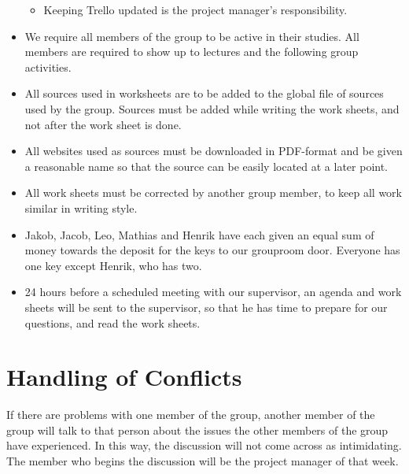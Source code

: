 \documentclass[a4paper,12pt,hidelinks]{article}
\begin{document}
\begin{itemize}
\begin{itemize}
		\item Keeping Trello updated is the project manager's responsibility.
		\end{itemize}
		\item We require all members of the group to be active in their studies. All members are required to show up to lectures and the following group activities.
		\item All sources used in worksheets are to be added to the global file of sources used by the group. Sources must be added while writing the work sheets, and not after the work sheet is done. 
		\item All websites used as sources must be downloaded in PDF-format and be given a reasonable name so that the source can be easily located at a later point.
		\item All work sheets must be corrected by another group member, to keep all work similar in writing style.
		\item Jakob, Jacob, Leo, Mathias and Henrik have each given an equal sum of money towards the deposit for the keys to our grouproom door. Everyone has one key except Henrik, who has two.
	\end{itemize}

	\begin{itemize}
		\item 24 hours before a scheduled meeting with our supervisor, an agenda and work sheets will be sent to the supervisor, so that he has time to prepare for our questions, and read the work sheets.
	\end{itemize}
	\section*{Handling of Conflicts}
	If there are problems with one member of the group, another member of the group will talk to that person about the issues the other members of the group have experienced. In this way, the discussion will not come across as intimidating. The member who begins the discussion will be the project manager of that week.
\end{document}
